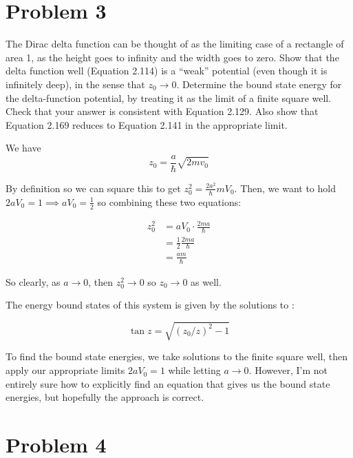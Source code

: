 \documentclass{article}
\begin{document}
    \pagebreak
    \section*{Problem 3}


    The Dirac delta function can be thought of as the limiting case of a rectangle of area 1, as the height goes to infinity and the width goes to zero. Show that the delta function well (Equation 2.114) is a ``weak'' potential (even though it is infinitely deep), in the sense that $z_0 \to 0$. Determine the bound state energy for the delta-function potential, by treating it as the limit of a finite square well. Check that your answer is consistent with Equation 2.129. Also show that Equation 2.169 reduces to Equation 2.141 in the appropriate limit.

    \begin{solution}

        We have 
        \[z_0 = \frac{a}{\hbar} \sqrt{2mv_0}\] 

        By definition so we can square this to get $z_0^2 = \frac{2a^2}{\hbar}mV_0$. Then, we want to hold $2aV_0 = 1 \implies aV_0 = \frac{1}{2}$ so combining these two equations:

        \begin{align*}
            z_0^2 &= aV_0 \cdot \frac{2ma}{\hbar}\\
            &= \frac{1}{2} \frac{2ma}{\hbar}\\
            &= \frac{am}{\hbar}
        \end{align*}

        So clearly, as $a \to 0$, then $z_0^2 \to 0$ so $z_0 \to 0$ as well.

        The energy bound states of this system is given by the solutions to :

        \[ \tan z = \sqrt{(z_0/z)^2 - 1}\]

        To find the bound state energies, we take solutions to the finite square well, then apply our appropriate limits $2aV_0 = 1$ while letting $a \to 0$. However, I'm not entirely sure how to explicitly find an equation that gives us the bound state energies, but hopefully the approach is correct.
    \end{solution}

    \pagebreak
    \section*{Problem 4}
\end{document}

